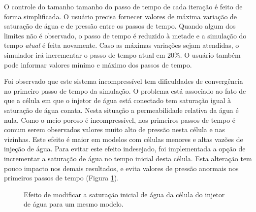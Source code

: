 \documentclass[final,5p]{elsarticle}
\numberwithin{equation}{section}
\begin{document}
        O controle do tamanho tamanho do passo de tempo de cada iteração é feito de forma simplificada. O usuário precisa fornecer valores de máxima variação de saturação de água e de pressão entre os passos de tempo. Quando algum dos limites não é observado, o passo de tempo é reduzido à metade e a simulação do tempo \emph{atual} é feita novamente. Caso as máximas variações sejam atendidas, o simulador irá incrementar o passo de tempo atual em 20\%. O usuário também pode informar valores mínimo e máximo dos passos de tempo.

        Foi observado que este sistema incompressível tem dificuldades de convergência no primeiro passo de tempo da simulação. O problema está associado ao fato de que a célula em que o injetor de água está conectado tem saturação igual à saturação de água conata. Nesta situação a permeabilidade relativa da água é nula. Como o meio poroso é incompressível, nos primeiros passos de tempo é comum serem observados valores muito alto de pressão nesta célula e nas vizinhas. Este efeito é maior em modelos com células menores e altas vazões de injeção de água.
        Para evitar este efeito indesejado, foi implementada a opção de incrementar a saturação de água no tempo inicial desta célula. Esta alteração tem pouco impacto nos demais resultados, e evita valores de pressão anormais nos primeiros passos de tempo (Figura \ref{fig:ajustesw}).

        \begin{figure}[hbt!]
            \caption{Efeito de modificar a saturação inicial de água da célula do injetor de água para um mesmo modelo.}
            \label{fig:ajustesw}
        \end{figure}
\end{document}
